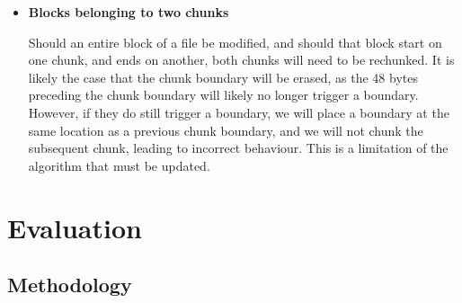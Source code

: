 \documentclass[table]{article}
\begin{document}
\begin{multicols}{2}
\begin{itemize}
        Should a block create or erase a chunk boundary, we chunk until we find a familiar block offset. During chunking, we are required to manage some indices. These counters require careful thought in the implementation to avoid bugs when dealing with edge cases. In order to lay the file out sequentially, when we chunk a file we need to know what index the chunk is in the file. For instance, if we process chunk 4, its index in the sequence of hashes that represent the file will be 3. Similarly, we need to use a counter to keep track of which chunk we're inspecting in the live chunk bitmap. Ideally, these two counters would be identical, however, we cannot assume that this is the case. Consider the following case: we have a bitmap of 0100, indicating to us that the 2nd chunk has changed. Our index into the bitmap is 1, and the next chunk that will be written will have index 1. When chunking the second chunk, the new modifications actually place a boundary in the middle of the chunk. When this happens, we write out two chunks and increment the file's index by 2. So, the index into our bitmap will be 2 on the next iteration, and the block number of the chunk we will be 3. Note that we can also eliminate a boundary with a modification, in which case the live chunk index will increment by 2, while the file index increments only by 1.

    \item \textbf{Blocks belonging to two chunks}
    
        Should an entire block of a file be modified, and should that block start on one chunk, and ends on another, both chunks will need to be rechunked. It is likely the case that the chunk boundary will be erased, as the 48 bytes preceding the chunk boundary will likely no longer trigger a boundary. However, if they do still trigger a boundary, we will place a boundary at the same location as a previous chunk boundary, and we will not chunk the subsequent chunk, leading to incorrect behaviour. This is a limitation of the algorithm that must be updated.

\end{itemize}

\section{Evaluation}

\subsection{Methodology}


\end{multicols}
\end{document}
